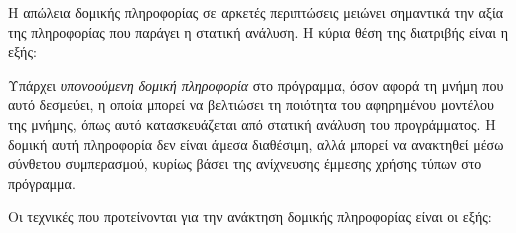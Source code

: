 Η απώλεια δομικής πληροφορίας σε αρκετές περιπτώσεις μειώνει σημαντικά
την αξία της πληροφορίας που παράγει η στατική ανάλυση. Η κύρια θέση
της διατριβής είναι η εξής:

\begin{displayquote}
  Υπάρχει \emph{υπονοούμενη δομική πληροφορία} στο πρόγραμμα, όσον
  αφορά τη μνήμη που αυτό δεσμεύει, η οποία μπορεί να βελτιώσει τη
  ποιότητα του αφηρημένου μοντέλου της μνήμης, όπως αυτό
  κατασκευάζεται από στατική ανάλυση του προγράμματος. Η δομική αυτή
  πληροφορία δεν είναι άμεσα διαθέσιμη, αλλά μπορεί να ανακτηθεί μέσω
  σύνθετου συμπερασμού, κυρίως βάσει της ανίχνευσης έμμεσης χρήσης
  τύπων στο πρόγραμμα.
\end{displayquote}


Οι τεχνικές που προτείνονται για την ανάκτηση δομικής πληροφορίας
είναι οι εξής:

